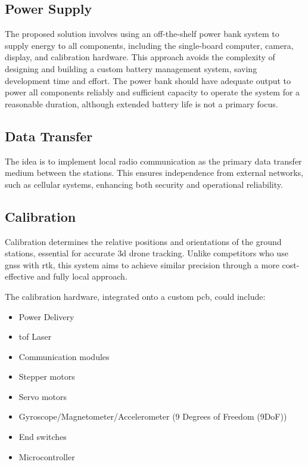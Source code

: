 \subsection{Power Supply}
The proposed solution involves using an off-the-shelf power bank system to supply energy to all components, including the single-board computer, camera, display, and calibration hardware. This approach avoids the complexity of designing and building a custom battery management system, saving development time and effort. The power bank should have adequate output to power all components reliably and sufficient capacity to operate the system for a reasonable duration, although extended battery life is not a primary focus.

\subsection{Data Transfer}
The idea is to implement local radio communication as the primary data transfer medium between the stations. This ensures independence from external networks, such as cellular systems, enhancing both security and operational reliability.

\subsection{Calibration}
Calibration determines the relative positions and orientations of the ground stations, essential for accurate \acrshort{3d} drone tracking. Unlike competitors who use \acrshort{gnss} with \acrshort{rtk}, this system aims to achieve similar precision through a more cost-effective and fully local approach. 

The calibration hardware, integrated onto a custom \acrfull{pcb}, could include:
\begin{itemize}
	\item Power Delivery
	\item \acrfull{tof} Laser
	\item Communication modules
	\item Stepper motors
	\item Servo motors
	\item Gyroscope/Magnetometer/Accelerometer (9 Degrees of Freedom (9DoF))
	\item End switches
	\item Microcontroller
\end{itemize}

